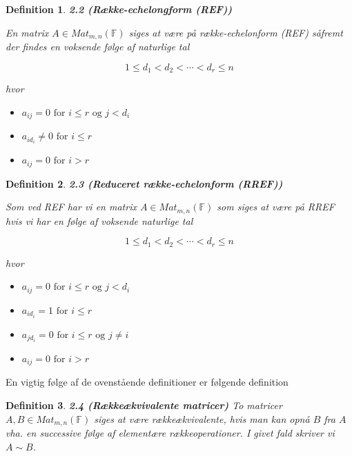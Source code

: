 \documentclass[paper=a4, fontsize=11pt]{scrartcl} %
\newtheorem*{definition}{Definition}
\newenvironment{cstmdefinition}[1]{\begin{definition} {\normalfont\textbf{#1}}}{\end{definition}}
\begin{document}
	\begin{cstmdefinition}{2.2 (Række-echelongform (REF))}
		
		En matrix $A \in Mat_{m,n}(\mathbb{F})$ siges at være på række-echelonform (REF) såfremt der findes en voksende følge af naturlige tal 
		
		\[1 \leq d_1 < d_2 < \cdots < d_r \leq n\]
		
		hvor
		
		\begin{itemize}
			\item $a_{ij} = 0 \mbox{ for } i \leq r \mbox{ og } j < d_i$
			\item $a_{id_i} \not = 0 \mbox{ for } i \leq r$
			\item $a_{ij} = 0 \mbox{ for } i > r$
		\end{itemize}
		
	\end{cstmdefinition}
	
	\begin{cstmdefinition}{2.3 (Reduceret række-echelonform (RREF))}
		
		Som ved REF har vi en matrix $A \in Mat_{m,n}(\mathbb{F})$ som siges at være på RREF hvis vi har en følge af voksende naturlige tal 
		
		\[1 \leq d_1 < d_2 < \cdots < d_r \leq n\]
		
		hvor 
		
		\begin{itemize}
			\item $a_{ij} = 0 \mbox{ for } i \leq r \mbox{ og } j < d_i$
			\item $a_{id_i} = 1 \mbox{ for } i \leq r$
			\item $a_{jd_i} = 0 \mbox{ for } i \leq r \mbox{ og } j \not = i$
			\item $a_{ij} = 0 \mbox{ for } i > r$
		\end{itemize}
		
	\end{cstmdefinition}
	
	En vigtig følge af de ovenstående definitioner er følgende definition
	
	\begin{cstmdefinition}{2.4 (Rækkeækvivalente matricer)}
		To matricer $A,B \in Mat_{m,n}(\mathbb{F})$ siges at være rækkeækvivalente, hvis man kan opnå $B$ fra $A$ vha. en successive følge af elementære rækkeoperationer. I givet fald skriver vi $A \sim B$.
	\end{cstmdefinition}
	
\end{document}
